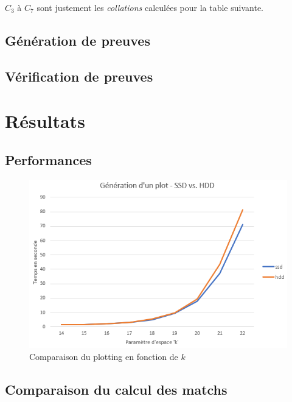 $C_3$ à $C_7$ sont justement les \emph{collations} calculées pour la table suivante.

\subsection{Génération de preuves}

\lipsum[1]

\subsection{Vérification de preuves}

\lipsum[1]

\section{Résultats}

\lipsum[1]

\subsection{Performances}

\begin{figure}[H]
  \centering
  \includegraphics[width=13cm]{images/bench_ssd_hdd.png}
  \caption{Comparaison du plotting en fonction de $k$}
\end{figure}

\subsection{Comparaison du calcul des matchs}

